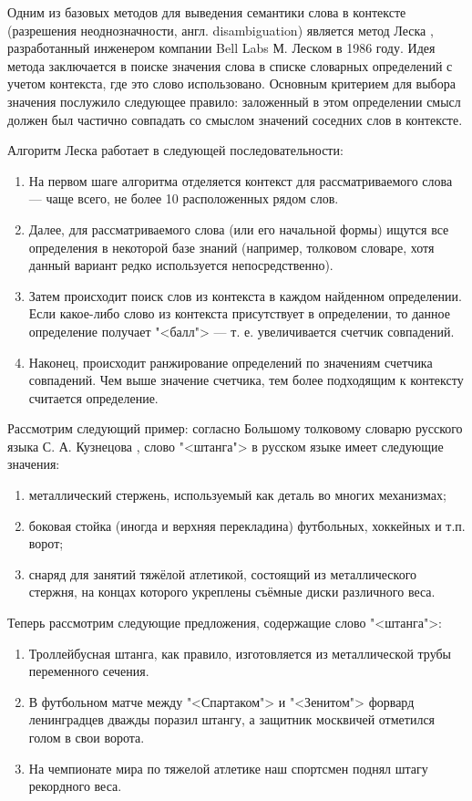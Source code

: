 Одним из базовых методов для выведения семантики слова в контексте (разрешения неоднозначности, англ. disambiguation)
является метод Леска \cite{10.1145/318723.318728}, разработанный инженером компании Bell Labs М. Леском в 1986 году.
Идея метода заключается в поиске значения слова в списке словарных определений с учетом контекста, где это слово использовано.
Основным критерием для выбора значения послужило следующее правило: заложенный в этом определении смысл должен был частично
совпадать со смыслом значений соседних слов в контексте.

Алгоритм Леска работает в следующей последовательности:
\begin{enumerate}[1)]
    \item На первом шаге алгоритма отделяется контекст для рассматриваемого слова --- чаще всего, не более 10 расположенных
          рядом слов.
    \item Далее, для рассматриваемого слова (или его начальной формы) ищутся все определения в некоторой базе знаний
          (например, толковом словаре, хотя данный вариант редко используется непосредственно).
    \item Затем происходит поиск слов из контекста в каждом найденном определении. Если какое-либо слово из контекста
          присутствует в определении, то данное определение получает "<балл"> --- т. е. увеличивается счетчик совпадений.
    \item Наконец, происходит ранжирование определений по значениям счетчика совпадений. Чем выше значение счетчика, тем более
          подходящим к контексту считается определение.
\end{enumerate}

Рассмотрим следующий пример: согласно Большому толковому словарю русского языка С. А. Кузнецова \cite{kuznecov2008noveishiy},
слово "<штанга"> в русском языке имеет следующие значения:
\begin{enumerate}[1)]
    \item металлический стержень, используемый как деталь во многих механизмах;
    \item боковая стойка (иногда и верхняя перекладина) футбольных, хоккейных и т.п. ворот;
    \item снаряд для занятий тяжёлой атлетикой, состоящий из металлического стержня, на концах которого укреплены
          съёмные диски различного веса.
\end{enumerate}

Теперь рассмотрим следующие предложения, содержащие слово "<штанга">:
\begin{enumerate}[1)]
    \item Троллейбусная штанга, как правило, изготовляется из металлической трубы переменного сечения.
    \item В футбольном матче между "<Спартаком"> и "<Зенитом"> форвард ленинградцев дважды поразил штангу, а защитник москвичей
          отметился голом в свои ворота.
    \item На чемпионате мира по тяжелой атлетике наш спортсмен поднял штагу рекордного веса.
\end{enumerate}

